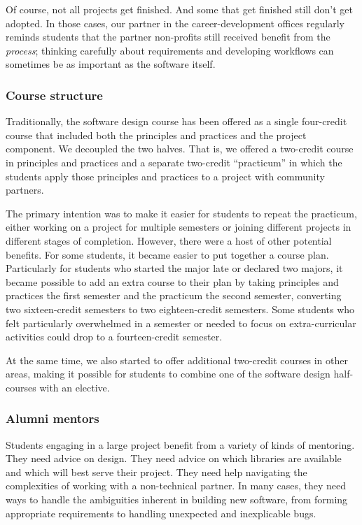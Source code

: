 Of course, not all projects get finished.  And some that get finished
still don't get adopted.  In those cases, our partner in the 
career-development offices regularly reminds students that the
partner non-profits still received benefit from the \textit{process};
thinking carefully about requirements and developing workflows can
sometimes be as important as the software itself.

\subsubsection{Course structure}

Traditionally, the software design course has been offered as a single
four-credit course that included both the principles and practices and
the project component.  We decoupled the two halves.  That is, we 
offered a two-credit course in principles and practices and
a separate two-credit ``practicum'' in which the students apply
those principles and practices to a project with community partners.

The primary intention was to make it easier for students to repeat
the practicum, either working on a project for multiple semesters
or joining different projects in different stages of completion.
However, there were a host of other potential benefits.  For some
students, it became easier to put together a course plan. Particularly
for students who started the major late or declared two
majors, it became possible to add an extra course to their plan by
taking principles and practices the first semester and
the practicum the second semester,
converting two sixteen-credit semesters to two eighteen-credit
semesters. 
Some students who felt particularly
overwhelmed in a semester or needed to focus on extra-curricular activities
could drop to a fourteen-credit semester.

At the same time, we also started to offer additional two-credit
courses in other areas, making it possible for students to combine
one of the software design half-courses with an elective.

\subsubsection{Alumni mentors}

Students engaging in a large project benefit from a variety of kinds
of mentoring.  They need advice on design.  They need advice on
which libraries are available and which will best serve their
project.  They need help navigating the complexities of working
with a non-technical partner.  In many cases, they need ways to
handle the ambiguities inherent in building new software, from
forming appropriate requirements to handling unexpected and
inexplicable bugs.


